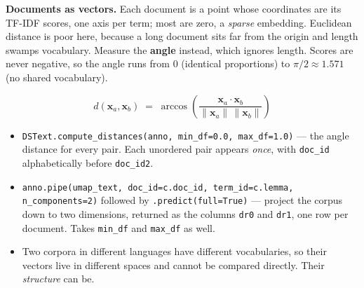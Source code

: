 \documentclass[11pt, a4paper]{article}
\newcommand{\code}[1]{\texttt{#1}}
\begin{document}
\smallskip

\textbf{Documents as vectors.}
Each document is a point whose coordinates are its TF-IDF scores, one axis per term; most are
zero, a \textit{sparse} embedding. Euclidean distance is poor here, because a long document
sits far from the origin and length swamps vocabulary. Measure the \textbf{angle} instead,
which ignores length. Scores are never negative, so the angle runs from $0$ (identical
proportions) to $\pi/2 \approx 1.571$ (no shared vocabulary).

\begin{equation*}
d(\mathbf{x}_a, \mathbf{x}_b) \;=\; \arccos\!\left( \frac{\mathbf{x}_a \cdot \mathbf{x}_b}{\lVert \mathbf{x}_a \rVert \, \lVert \mathbf{x}_b \rVert} \right)
\end{equation*}

\begin{itemize}
  \item \code{DSText.compute\_distances(anno, min\_df=0.0, max\_df=1.0)} --- the angle distance
        for every pair. Each unordered pair appears \textit{once}, with \code{doc\_id}
        alphabetically before \code{doc\_id2}.
  \item \code{anno.pipe(umap\_text, doc\_id=c.doc\_id, term\_id=c.lemma, n\_components=2)}
        followed by \code{.predict(full=True)} --- project the corpus down to two dimensions,
        returned as the columns \code{dr0} and \code{dr1}, one row per document. Takes
        \code{min\_df} and \code{max\_df} as well.
  \item Two corpora in different languages have different vocabularies, so their vectors live
        in different spaces and cannot be compared directly. Their \textit{structure} can be.
\end{itemize}
\end{document}
